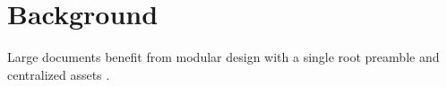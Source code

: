 \section{Background}
Large documents benefit from modular design with a single root preamble and centralized assets \parencite{Hang2024}.
